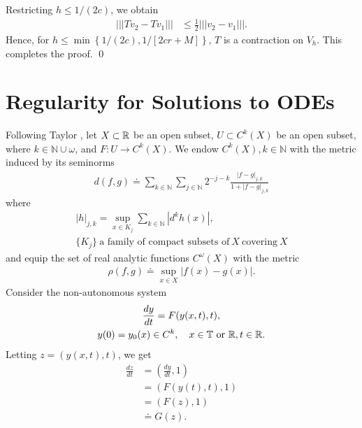 %
%
Restricting $h \le 1/(2c)$, we obtain
\begin{equation*}
	\begin{split}
		| | | Tv_2 - Tv_1 | | | & \le \frac{1}{2} | | | v_2 - v_1 | | |. 
	\end{split}
\end{equation*}
Hence, for $h \le \min\left\{1/(2c), 1/[2cr + M] \right\}$, $T$ is a
contraction on $V_h$. This completes the proof. \qed
%
%
%
%
%
%
%
\section{Regularity for Solutions to ODEs} 
\label{sec:dep-param}
%
%
Following Taylor \cite{Taylor:1995kx}, let $X \subset \mathbb{R}$ be an open subset,
$U \subset C^{k}(X)$ be an open subset, where $k \in \mathbb{N}\cup \omega$, and
$F: U \to C^{k}(X)$. We endow $C^{k}(X), k \in \mathbb{N}$ with the metric
induced by its seminorms
%
%
\begin{equation*}
\begin{split}
d(f, g) \doteq \sum_{k \in \mathbb{N}} \sum_{j \in \mathbb{N}} 2^{-j -k} \frac{|
f-g |_{j, k}}{1 + | f-g |_{j, k}}
\end{split}
\end{equation*}
%
where
%
%
\begin{gather*}
|h|_{j,k}  = \sup_{x \in K_j} \sum_{k \in \mathbb{N}} |d^{k}h(x)|,
\\
\{ K_{j} \} \ \text{a family of compact subsets of} \ X \  \text{covering} \ X
\end{gather*}
%
%
%
and equip the set of real analytic functions $C^{\omega}(X)$ with the
metric
%
%
\begin{equation*}
\begin{split}
\rho(f,g) \doteq \sup_{x \in X} |f(x) - g(x)|.
\end{split}
\end{equation*}
%
%
Consider the non-autonomous system
%
%
\begin{gather}
  \label{aa}
\frac{dy}{dt} = F(y(x,t), t),
\\
y(0)= y_{0}(x) \in C^{k}, \quad x \in \mathbb{T} \ \text{or} \ \mathbb{R},t \in \mathbb{R}.
\label{bb}
\end{gather}
%
Letting $z = (y(x,t), t)$, we get
%
%
\begin{equation*}
\begin{split}
\frac{dz}{dt}  
& = \left (\frac{dy}{dt}, 1 \right )
\\
& = \left( F(y(t), t), 1 \right)
\\
& = \left( F(z), 1 \right)
\\
& \doteq G(z).
\end{split}
\end{equation*}
